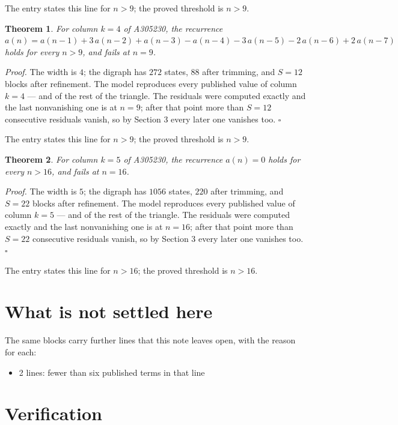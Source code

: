 \documentclass[11pt]{article}
\newtheorem{theorem}{Theorem}
\theoremstyle{definition}
\begin{document}
The entry states this line for $n > 9$; the proved threshold is $n > 9$.

\begin{theorem} For column $k = 4$ of A305230, the recurrence $a(n) = a(n-1) + 3\,a(n-2) + a(n-3) - a(n-4) - 3\,a(n-5) - 2\,a(n-6) + 2\,a(n-7)$ holds for every $n > 9$, and fails at $n = 9$.\end{theorem}

{\itshape Proof.} The width is $4$; the digraph has $272$ states, $88$ after trimming, and $S = 12$ blocks after refinement. The model reproduces every published value of column $k = 4$ --- and of the rest of the triangle. The residuals were computed exactly and the last nonvanishing one is at $n = 9$; after that point more than $S = 12$ consecutive residuals vanish, so by Section 3 every later one vanishes too. $\square$

The entry states this line for $n > 9$; the proved threshold is $n > 9$.

\begin{theorem} For column $k = 5$ of A305230, the recurrence $a(n) = 0$ holds for every $n > 16$, and fails at $n = 16$.\end{theorem}

{\itshape Proof.} The width is $5$; the digraph has $1056$ states, $220$ after trimming, and $S = 22$ blocks after refinement. The model reproduces every published value of column $k = 5$ --- and of the rest of the triangle. The residuals were computed exactly and the last nonvanishing one is at $n = 16$; after that point more than $S = 22$ consecutive residuals vanish, so by Section 3 every later one vanishes too. $\square$

The entry states this line for $n > 16$; the proved threshold is $n > 16$.

\section{What is not settled here}

The same blocks carry further lines that this note leaves open, with the reason for each:

\begin{itemize}

\item 2 lines: fewer than six published terms in that line

\end{itemize}

\section{Verification}
\end{document}
